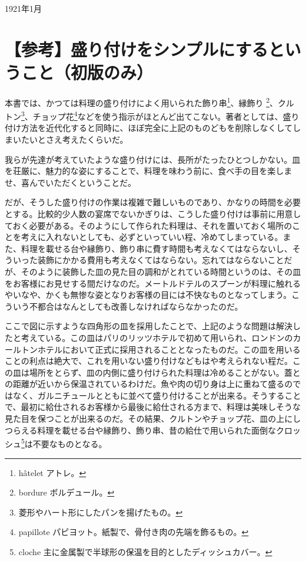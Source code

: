 \begin{flushright}
1921年1月
\end{flushright}

\newpage
\small
{}

\hypertarget{remarque-sur-la-simplification-des-procedes-de-dressage}{%
\section{【参考】盛り付けをシンプルにするということ（初版のみ）}\label{remarque-sur-la-simplification-des-procedes-de-dressage}}

本書では、かつては料理の盛り付けによく用いられた飾り串\footnote{hâtelet
  アトレ。}、縁飾り \footnote{bordure ボルデュール。}、クルトン\footnote{菱形やハート形にしたパンを揚げたもの。}、チョップ花\footnote{papillote
  パピヨット。紙製で、骨付き肉の先端を飾るもの。}などを使う指示がほとんど出てこない。著者としては、盛り付け方法を近代化すると同時に、ほぼ完全に上記のものどもを削除しなくしてしまいたいとさえ考えたくらいだ。

我らが先達が考えていたような盛り付けには、長所がたったひとつしかない。皿を荘厳に、魅力的な姿にすることで、料理を味わう前に、食べ手の目を楽しませ、喜んでいただくということだ。

だが、そうした盛り付けの作業は複雑で難しいものであり、かなりの時間を必要とする。比較的少人数の宴席でないかぎりは、こうした盛り付けは事前に用意しておく必要がある。そのようにして作られた料理は、それを置いておく場所のことを考えに入れないとしても、必ずといっていい程、冷めてしまっている。また、料理を載せる台や縁飾り、飾り串に費す時間も考えなくてはならないし、そういった装飾にかかる費用も考えなくてはならない。忘れてはならないことだが、そのように装飾した皿の見た目の調和がとれている時間というのは、その皿をお客様にお見せする間だけなのだ。メートルドテルのスプーンが料理に触れるやいなや、かくも無惨な姿となりお客様の目には不快なものとなってしまう。こういう不都合はなんとしても改善しなければならなかったのだ。

ここで図に示すような四角形の皿を採用したことで、上記のような問題は解決したと考えている。この皿はパリのリッツホテルで初めて用いられ、ロンドンのカールトンホテルにおいて正式に採用されることとなったものだ。この皿を用いることの利点は絶大で、これを用いない盛り付けなどもはや考えられない程だ。この皿は場所をとらず、皿の内側に盛り付けられた料理は冷めることがない。蓋との距離が近いから保温されているわけだ。魚や肉の切り身は上に重ねて盛るのではなく、ガルニチュールとともに並べて盛り付けることが出来る。そうすることで、最初に給仕されるお客様から最後に給仕される方まで、料理は美味しそうな見た目を保つことが出来るのだ。その結果、クルトンやチョップ花、皿の上にしつらえる料理を載せる台や縁飾り、飾り串、昔の給仕で用いられた面倒なクロッシュ\footnote{cloche
  主に金属製で半球形の保温を目的としたディッシュカバー。}は不要なものとなる。


